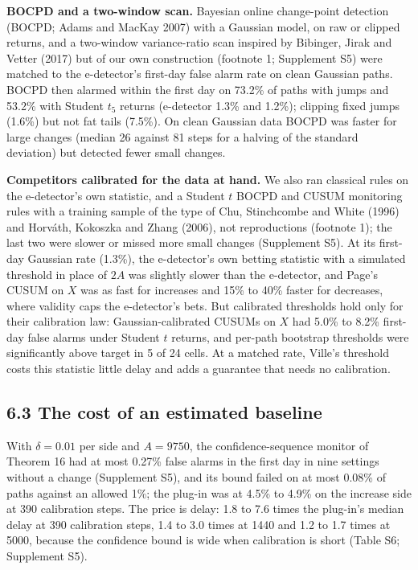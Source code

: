 \documentclass[
]{article}
\begin{document}
\textbf{BOCPD and a two-window scan.} Bayesian online change-point
detection (BOCPD; Adams and MacKay 2007) with a Gaussian model, on raw
or clipped returns, and a two-window variance-ratio scan inspired by
Bibinger, Jirak and Vetter (2017) but of our own construction (footnote
1; Supplement S5) were matched to the e-detector's first-day false alarm
rate on clean Gaussian paths. BOCPD then alarmed within the first day on
73.2\% of paths with jumps and 53.2\% with Student \(t_5\) returns
(e-detector 1.3\% and 1.2\%); clipping fixed jumps (1.6\%) but not fat
tails (7.5\%). On clean Gaussian data BOCPD was faster for large changes
(median 26 against 81 steps for a halving of the standard deviation) but
detected fewer small changes.

\textbf{Competitors calibrated for the data at hand.} We also ran
classical rules on the e-detector's own statistic, and a Student \(t\)
BOCPD and CUSUM monitoring rules with a training sample of the type of
Chu, Stinchcombe and White (1996) and Horváth, Kokoszka and Zhang
(2006), not reproductions (footnote 1); the last two were slower or
missed more small changes (Supplement S5). At its first-day Gaussian
rate (1.3\%), the e-detector's own betting statistic with a simulated
threshold in place of \(2A\) was slightly slower than the e-detector,
and Page's CUSUM on \(X\) was as fast for increases and 15\% to 40\%
faster for decreases, where validity caps the e-detector's bets. But
calibrated thresholds hold only for their calibration law:
Gaussian-calibrated CUSUMs on \(X\) had 5.0\% to 8.2\% first-day false
alarms under Student \(t\) returns, and per-path bootstrap thresholds
were significantly above target in 5 of 24 cells. At a matched rate,
Ville's threshold costs this statistic little delay and adds a guarantee
that needs no calibration.

\hypertarget{the-cost-of-an-estimated-baseline}{%
\subsection{6.3 The cost of an estimated
baseline}\label{the-cost-of-an-estimated-baseline}}

With \(\delta = 0.01\) per side and \(A = 9750\), the
confidence-sequence monitor of Theorem 16 had at most 0.27\% false
alarms in the first day in nine settings without a change (Supplement
S5), and its bound failed on at most 0.08\% of paths against an allowed
1\%; the plug-in was at 4.5\% to 4.9\% on the increase side at 390
calibration steps. The price is delay: 1.8 to 7.6 times the plug-in's
median delay at 390 calibration steps, 1.4 to 3.0 times at 1440 and 1.2
to 1.7 times at 5000, because the confidence bound is wide when
calibration is short (Table S6; Supplement S5).
\end{document}
